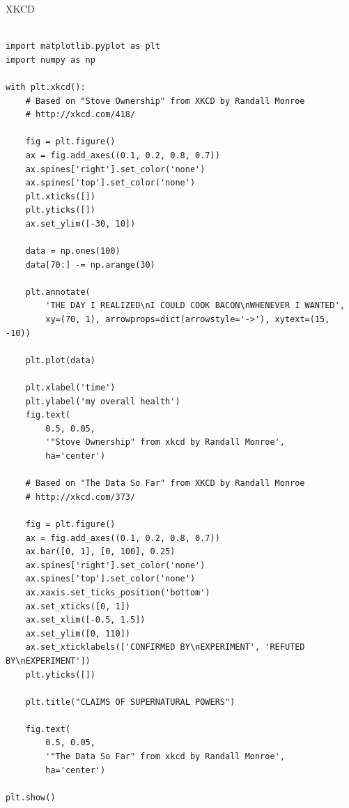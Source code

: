 \documentclass{beamer}
\begin{document}
\begin{frame}[t,fragile]{XKCD}


	\scriptsize
\begin{verbatim}

import matplotlib.pyplot as plt
import numpy as np

with plt.xkcd():
    # Based on "Stove Ownership" from XKCD by Randall Monroe
    # http://xkcd.com/418/

    fig = plt.figure()
    ax = fig.add_axes((0.1, 0.2, 0.8, 0.7))
    ax.spines['right'].set_color('none')
    ax.spines['top'].set_color('none')
    plt.xticks([])
    plt.yticks([])
    ax.set_ylim([-30, 10])

    data = np.ones(100)
    data[70:] -= np.arange(30)

    plt.annotate(
        'THE DAY I REALIZED\nI COULD COOK BACON\nWHENEVER I WANTED',
        xy=(70, 1), arrowprops=dict(arrowstyle='->'), xytext=(15, -10))

    plt.plot(data)

    plt.xlabel('time')
    plt.ylabel('my overall health')
    fig.text(
        0.5, 0.05,
        '"Stove Ownership" from xkcd by Randall Monroe',
        ha='center')

    # Based on "The Data So Far" from XKCD by Randall Monroe
    # http://xkcd.com/373/

    fig = plt.figure()
    ax = fig.add_axes((0.1, 0.2, 0.8, 0.7))
    ax.bar([0, 1], [0, 100], 0.25)
    ax.spines['right'].set_color('none')
    ax.spines['top'].set_color('none')
    ax.xaxis.set_ticks_position('bottom')
    ax.set_xticks([0, 1])
    ax.set_xlim([-0.5, 1.5])
    ax.set_ylim([0, 110])
    ax.set_xticklabels(['CONFIRMED BY\nEXPERIMENT', 'REFUTED BY\nEXPERIMENT'])
    plt.yticks([])

    plt.title("CLAIMS OF SUPERNATURAL POWERS")

    fig.text(
        0.5, 0.05,
        '"The Data So Far" from xkcd by Randall Monroe',
        ha='center')

plt.show()


\end{verbatim}


\end{frame}
\end{document}
